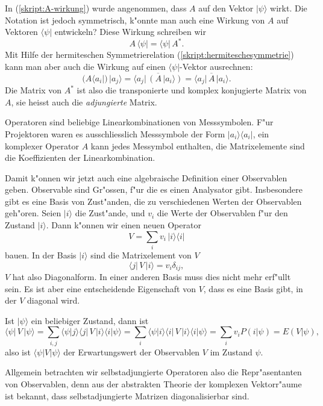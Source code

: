 In (\ref{skript:A-wirkung}) wurde angenommen, dass $A$ auf den Vektor
$|\psi\rangle$ wirkt. Die Notation ist jedoch symmetrisch, k"onnte
man auch eine Wirkung von $A$ auf Vektoren $\langle\psi|$ entwickeln?
Diese Wirkung schreiben wir
\[
A\,\langle \psi|=\langle\psi|\,A^*.
\]
Mit Hilfe der hermiteschen Symmetrierelation (\ref{skript:hermiteschesymmetrie})
kann man aber auch die Wirkung auf einen $\langle\psi|$-Vektor ausrechnen:
\begin{equation}
(A\langle a_i|)\,|a_j\rangle
=
\overline{\langle a_j|\,(A\,|a_i\rangle)}
=
\overline{\langle a_j|\,A\,|a_i\rangle}.
\end{equation}
Die Matrix von $A^*$
ist also die transponierte und komplex konjugierte Matrix von $A$,
sie heisst auch die {\em adjungierte} Matrix.

Operatoren sind beliebige Linearkombinationen von Messsymbolen.
F"ur Projektoren waren es ausschliesslich Messsymbole der Form
$|a_i\rangle\langle a_i|$, ein komplexer Operator $A$ kann jedes
Messymbol enthalten, die Matrixelemente sind die Koeffizienten 
der Linearkombination.

Damit k"onnen wir jetzt auch eine algebraische Definition einer
Observablen geben. Observable sind Gr"ossen, f"ur die es einen
Analysator gibt. Insbesondere gibt es eine Basis von Zust"anden,
die zu verschiedenen Werten der Observablen geh"oren.
Seien $|i\rangle$ die Zust"ande, und $v_i$ die Werte der Observablen
f"ur den Zustand $|i\rangle$. Dann k"onnen wir einen neuen
Operator
\[
V = \sum_{i} v_i\, |i\rangle\langle i|
\]
bauen. In der Basis $|i\rangle$ sind die Matrixelement von $V$
\[
\langle j|\,V\,|i\rangle = v_i\delta_{ij},
\]
$V$ hat also Diagonalform. In einer anderen Basis muss dies nicht
mehr erf"ullt sein. Es ist aber eine entscheidende Eigenschaft 
von $V$, dass es eine Basis gibt, in der $V$ diagonal wird.

Ist $|\psi\rangle$ ein beliebiger Zustand, dann ist
\[
\langle\psi|\,V\,|\psi\rangle
=
\sum_{i,j}\langle \psi|j\rangle\langle j|\,V\,|i\rangle\langle i|\psi\rangle
=
\sum_i\langle \psi|i\rangle\langle i|\,V\,|i\rangle\langle i|\psi\rangle
=
\sum_i v_i P(i|\psi)=E(V|\psi),
\]
also ist $\langle \psi|V|\psi\rangle$ der Erwartungswert der Observablen
$V$ im Zustand $\psi$.

Allgemein betrachten wir selbstadjungierte Operatoren also 
die Repr"asentanten von Observablen, denn aus der abstrakten
Theorie der komplexen Vektorr"aume ist bekannt, dass selbstadjungierte
Matrizen diagonalisierbar sind.

